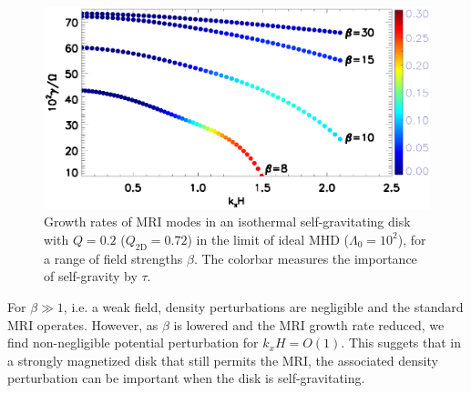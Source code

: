 \begin{figure}
  \includegraphics[width=\linewidth]{figures/compare_energy_ideal}
  \caption{Growth rates of MRI modes in an isothermal self-gravitating
    disk with $Q=0.2$ ($Q_\mathrm{2D}=0.72$) in the limit of ideal MHD
    ($\Lambda_0=10^2$), for a range of field strengths $\beta$. The
    colorbar measures the importance of self-gravity by $\tau$.  
    \label{gravity_energy}}
\end{figure}

For $\beta\gg 1$, i.e. a weak field, density perturbations are
negligible and the standard MRI operates. However, as $\beta$ is
lowered and the MRI growth rate reduced, we find non-negligible
potential perturbation for $k_xH=O(1)$. This suggets that in a
strongly magnetized disk that still permits the MRI, the associated
density perturbation can be important when the disk is
self-gravitating. %



  
 

